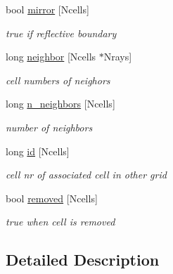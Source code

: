 \begin{DoxyCompactItemize}
\mbox{\label{structCELLS_a8b5f3445af867b28352d962986dd69e0}} 
bool \mbox{\hyperlink{structCELLS_a8b5f3445af867b28352d962986dd69e0}{mirror}} \mbox{[}Ncells\mbox{]}
\begin{DoxyCompactList}\small\item\em true if reflective boundary \end{DoxyCompactList}\item 
\mbox{\label{structCELLS_a2750bb5957e73f6a1d62a049fd5f8f48}} 
long \mbox{\hyperlink{structCELLS_a2750bb5957e73f6a1d62a049fd5f8f48}{neighbor}} \mbox{[}Ncells $\ast$Nrays\mbox{]}
\begin{DoxyCompactList}\small\item\em cell numbers of neighors \end{DoxyCompactList}\item 
\mbox{\label{structCELLS_a8112fcb9a52a6883574a5ab274277f2e}} 
long \mbox{\hyperlink{structCELLS_a8112fcb9a52a6883574a5ab274277f2e}{n\+\_\+neighbors}} \mbox{[}Ncells\mbox{]}
\begin{DoxyCompactList}\small\item\em number of neighbors \end{DoxyCompactList}\item 
\mbox{\label{structCELLS_a05305565dce0a09449307f165a98799c}} 
long \mbox{\hyperlink{structCELLS_a05305565dce0a09449307f165a98799c}{id}} \mbox{[}Ncells\mbox{]}
\begin{DoxyCompactList}\small\item\em cell nr of associated cell in other grid \end{DoxyCompactList}\item 
\mbox{\label{structCELLS_affdae8cfe8261f6dfadb7de3390bba43}} 
bool \mbox{\hyperlink{structCELLS_affdae8cfe8261f6dfadb7de3390bba43}{removed}} \mbox{[}Ncells\mbox{]}
\begin{DoxyCompactList}\small\item\em true when cell is removed \end{DoxyCompactList}\end{DoxyCompactItemize}


\subsection{Detailed Description}
